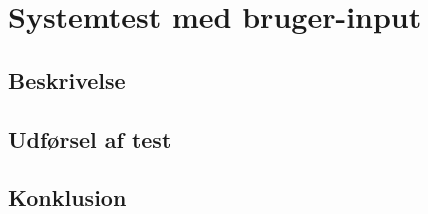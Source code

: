 \section{Systemtest med bruger-input}

\subsection{Beskrivelse}
\subsection{Udførsel af test}
\subsection{Konklusion}
